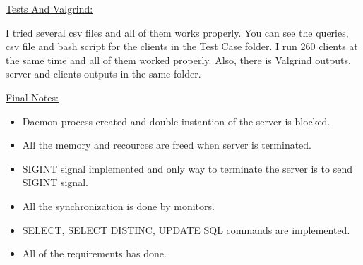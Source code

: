 \documentclass[12pt]{article}
\renewcommand{\_}{\kern-1.5pt\textunderscore\kern-1.5pt}
\begin{document}
\vspace{\baselineskip}
\begin{justify}
{\fontsize{16pt}{19.2pt}\selectfont \uline{Tests And Valgrind:}}
\end{justify}
\begin{justify}
I tried several csv files and all of them works properly. You can see the queries, csv file and bash script for the clients in the Test Case folder. I run 260 clients at the same time and all of them worked properly. Also, there is Valgrind outputs, server and clients outputs in the same folder. 
\end{justify}
\begin{justify}
{\fontsize{16pt}{19.2pt}\selectfont \uline{Final Notes:}}
\end{justify}
\setlength{\parskip}{0.0pt}
\begin{itemize}
	\item Daemon process created and double instantion of the server is blocked.
\setlength{\parskip}{8.04pt}
	\item All the memory and recources are freed when server is terminated.
	\item SIGINT signal implemented and only way to terminate the server is to send SIGINT signal.
\end{itemize}
\begin{itemize}
	\item All the synchronization is done by monitors.
	\item SELECT, SELECT DISTINC, UPDATE SQL commands are implemented.
	\item All of the requirements has done.
\end{itemize}
\printbibliography
\end{document}
